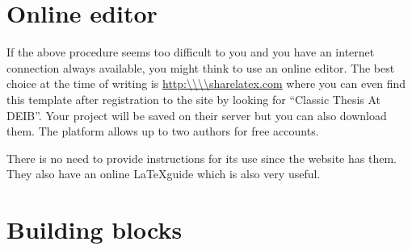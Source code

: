 \section{Online editor}
If the above procedure seems too difficult to you and you have an internet connection always available, you might think to use an online editor. The best choice at the time of writing is \url{http:\\\\sharelatex.com} where you can even find this template after registration to the site by looking for \enquote{Classic Thesis At DEIB}. Your project will be saved on their server but you can also download them. The platform allows up to two authors for free accounts.

There is no need to provide instructions for its use since the website has them. They also have an online \LaTeX guide which is also very useful.

\section{Building blocks}

